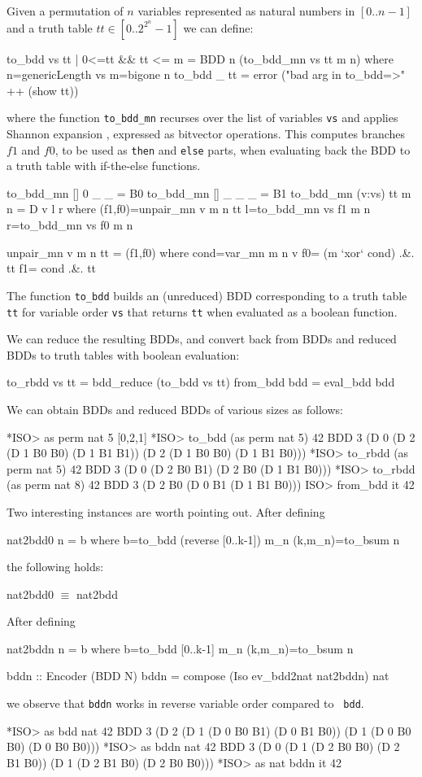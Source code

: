 \documentclass[]{INCLUDES/llncs}
\begin{document}
Given a permutation of $n$ variables represented as
natural numbers in $[0..n-1]$ and a truth table
$tt \in [0..2^{2^n}-1]$ we can define: 
\begin{code}
to_bdd vs tt | 0<=tt && tt <= m = 
  BDD n (to_bdd_mn vs tt m n) where
    n=genericLength vs
    m=bigone n
to_bdd _ tt = error 
   ("bad arg in to_bdd=>" ++ (show tt)) 
\end{code}
where the function {\tt to\_bdd\_mn} recurses over
the list of variables {\tt vs} and applies
Shannon expansion \cite{shannon_all},
expressed as bitvector operations. This computes
branches $f1$ and $f0$, to be used as {\tt then} and {\tt else}
parts, when evaluating back the BDD to a truth table
with if-the-else functions.
\begin{code}
to_bdd_mn []      0 _ _ = B0
to_bdd_mn []      _ _ _ = B1
to_bdd_mn (v:vs) tt m n = D v l r where
  (f1,f0)=unpair_mn v m n tt
  l=to_bdd_mn vs f1 m n
  r=to_bdd_mn vs f0 m n
  
unpair_mn v m n tt = (f1,f0) where
  cond=var_mn m n v
  f0= (m `xor` cond) .&. tt
  f1= cond .&. tt
\end{code}
\begin{prop}
The function {\tt to\_bdd} builds an (unreduced) BDD corresponding
to a truth table {\tt tt} for variable order {\tt vs} that returns
{\tt tt} when evaluated as a boolean function.
\end{prop}
We can reduce the resulting BDDs, and convert back from BDDs and reduced BDDs to
truth tables with boolean evaluation: 
\begin{code}
to_rbdd vs tt = bdd_reduce (to_bdd vs tt)
from_bdd bdd = eval_bdd bdd
\end{code}
We can obtain BDDs and reduced BDDs of various sizes as follows:
\begin{codex}
*ISO> as perm nat 5
[0,2,1]
*ISO> to_bdd (as perm nat 5) 42
BDD 3 (D 0 (D 2 (D 1 B0 B0) (D 1 B1 B1)) 
           (D 2 (D 1 B0 B0) (D 1 B1 B0)))
*ISO> to_rbdd (as perm nat 5) 42
BDD 3 (D 0 (D 2 B0 B1) (D 2 B0 (D 1 B1 B0)))
*ISO> to_rbdd (as perm nat 8) 42
BDD 3 (D 2 B0 (D 0 B1 (D 1 B1 B0)))
ISO> from_bdd it
42
\end{codex}
Two interesting instances are worth pointing out. After defining
\begin{code}
nat2bdd0 n = b where 
  b=to_bdd (reverse [0..k-1]) m_n
  (k,m_n)=to_bsum n
\end{code}
the following holds:
\begin{prop}
nat2bdd0 $\equiv$ nat2bdd
\end{prop}
After defining
\begin{code}
nat2bddn n = b where 
  b=to_bdd [0..k-1] m_n
  (k,m_n)=to_bsum n

bddn :: Encoder (BDD N)
bddn = compose (Iso ev_bdd2nat nat2bddn) nat
\end{code}
we observe that {\tt bddn} works in reverse variable order compared to {\tt
bdd}.
\begin{codex}
*ISO> as bdd nat 42
BDD 3 (D 2 (D 1 (D 0 B0 B1) (D 0 B1 B0)) (D 1 (D 0 B0 B0) (D 0 B0 B0)))
*ISO> as bddn nat 42
BDD 3 (D 0 (D 1 (D 2 B0 B0) (D 2 B1 B0)) (D 1 (D 2 B1 B0) (D 2 B0 B0)))
*ISO> as nat bddn it
42
\end{codex}
\end{document}
